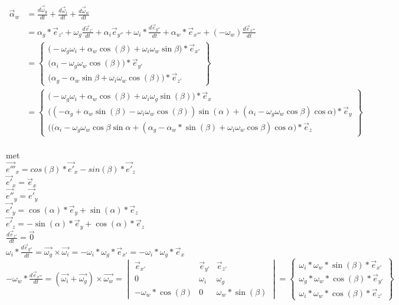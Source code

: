 \documentclass[a4paper,10pt]{article}
\begin{document}
\begin{equation}
\begin{aligned}
\vec{\alpha}_{w} &= \frac{d\vec{\omega}_{g}}{dt} + \frac{d\vec{\omega}_{i}}{dt} + \frac{d\vec{\omega}_{w}}{dt}\\
&= \alpha_g *  \vec{e}_{z'} + \omega_g  \frac{d\vec{e}_{z'}}{dt} + \alpha_i   \vec{e}_{y''} + \omega_i * \frac{d\vec{e}_{y''}}{dt} + \alpha_w * \vec{e}_{x'''} + (-\omega_w)  \frac{d\vec{e}_{x'''}}{dt}\\
&=\begin{Bmatrix}
\Big(- {\omega}_{g} {\omega}_{i} + \alpha_w\cos(\beta) +\omega_i\omega_w \sin{\beta} \Big)*\vec{e}_{x'} \\
\Big(\alpha_i - \omega_g\omega_w\cos(\beta)\Big)*\vec{e}_{y'}\\
\Big(\alpha_g  -\alpha_w\sin{\beta}+ \omega_i\omega_w\cos(\beta)\Big)*\vec{e}_{z'}
\end{Bmatrix}\\
&=\begin{Bmatrix}
\Big(- {\omega}_{g}  {\omega}_{i} + \alpha_w\cos(\beta) +\omega_i\omega_g\sin(\beta) \Big)* \vec{e}_{x} \\
\Big((-\alpha_g  +\alpha_w\sin(\beta)- \omega_i\omega_w\cos(\beta)) \sin(\alpha) + (\alpha_i - \omega_g\omega_w\cos{\beta})\cos{\alpha}  \Big) * \vec{e}_{y} \\
\Big((\alpha_i - \omega_g\omega_w\cos{\beta}\sin{\alpha} + (\alpha_g  -\alpha_w*\sin(\beta)+ \omega_i\omega_w\cos{\beta}) \cos{\alpha} \Big) * \vec{e}_{z}
\end{Bmatrix}
\end{aligned}
\end{equation}\\
met \\
$\vec{e'''}_{x} = cos(\beta) *\vec{e'}_{x} - sin(\beta) *\vec{e'}_{z}$\\
$\vec{e'}_{x}=\vec{e}_{x}$\\
$\vec{e''}_{y} = \vec{e'}_{y} $\\
$\vec{e'}_{y} = \cos(\alpha)*\vec{e}_{y} + \sin(\alpha)*\vec{e}_z $\\
$\vec{e'}_{z} = -\sin(\alpha)*\vec{e}_{y} + \cos(\alpha)*\vec{e}_z $\\
$\frac{d\vec{e}_{z'}}{dt}=\vec{0}$\\
$\omega_i * \frac{d\vec{e}_{y''}}{dt}=\vec{\omega_g}\times\vec{\omega_i} = -\omega_i * \omega_g *\vec{e}_{x'} = -\omega_i * \omega_g *\vec{e}_{x}  $\\
$-\omega_w * \frac{d\vec{e}_{x'''}}{dt} = (\vec{\omega_i} + \vec{\omega_g})\times\vec{\omega_w} = \begin{vmatrix}
\vec{e}_{x'}&\vec{e}_{y'}&\vec{e}_{z'}\\
0 & \omega_i & \omega_g\\
-\omega_w * \cos(\beta) & 0 & \omega_w * \sin(\beta)
\end{vmatrix} = \begin{Bmatrix}
\omega_i*\omega_w * \sin(\beta)  *\vec{e}_{x'} \\
\omega_g*\omega_w *\cos(\beta) *\vec{e}_{y'}\\
\omega_i*\omega_w * \cos(\beta) *\vec{e}_{z'}
\end{Bmatrix}
$
\end{document}
